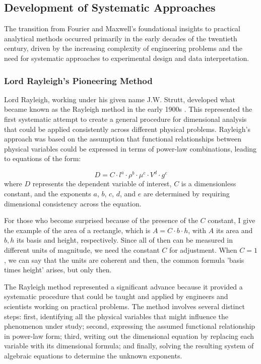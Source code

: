 \documentclass[
	11pt, %
	fleqn, %
	a4paper, %
]{LegrandOrangeBook}
\begin{document}
\subsection{Development of Systematic Approaches}

The transition from Fourier and Maxwell's foundational insights to practical analytical methods occurred primarily in the early decades of the twentieth century, driven by the increasing complexity of engineering problems and the need for systematic approaches to experimental design and data interpretation.

\subsubsection{Lord Rayleigh's Pioneering Method}

Lord Rayleigh, working under his given name J.W. Strutt, developed what became known as the Rayleigh method in the early 1900s \cite{rayleigh1915}. This represented the first systematic attempt to create a general procedure for dimensional analysis that could be applied consistently across different physical problems. Rayleigh's approach was based on the assumption that functional relationships between physical variables could be expressed in terms of power-law combinations, leading to equations of the form:

\begin{equation}
D = C \cdot l^a \cdot \rho^b \cdot \mu^c \cdot V^d \cdot g^e
\end{equation}
where $D$ represents the dependent variable of interest, $C$ is a dimensionless constant, and the exponents $a$, $b$, $c$, $d$, and $e$ are determined by requiring dimensional consistency across the equation.

For those who become surprised because of the presence of the $C$ constant, I give the example of the area of a rectangle, which is $A=C\cdot b \cdot h$, with $A$ its area and $b,h$ its basis and height, respectively. Since all of then can be measured in different units of magnitude, we need the constant $C$ for adjustment. When $C=1$, we can say that the units are coherent and then, the common formula 'basis times height' arises, but only then.

The Rayleigh method represented a significant advance because it provided a systematic procedure that could be taught and applied by engineers and scientists working on practical problems. The method involves several distinct steps: first, identifying all the physical variables that might influence the phenomenon under study; second, expressing the assumed functional relationship in power-law form; third, writing out the dimensional equation by replacing each variable with its dimensional formula; and finally, solving the resulting system of algebraic equations to determine the unknown exponents.
\end{document}
